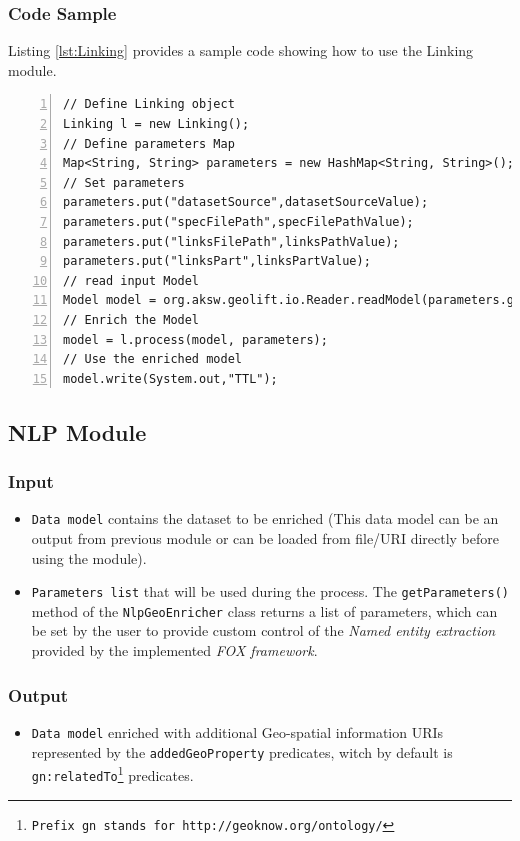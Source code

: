 \documentclass[a4paper,twoside,bibtotoc,abstracton,12pt,BCOR=15mm]{article}
\begin{document}
\subsubsection{Code Sample}
Listing \ref{lst:Linking} provides a sample code showing how to use the Linking module.
\begingroup
    \fontsize{8pt}{10pt}\selectfont
\begin{lstlisting}[label=lst:Linking, numbers=left, numberstyle=\tiny, caption = Code fragment to call the \texttt{Linking} class.]
// Define Linking object
Linking l = new Linking();
// Define parameters Map
Map<String, String> parameters = new HashMap<String, String>();
// Set parameters
parameters.put("datasetSource",datasetSourceValue);
parameters.put("specFilePath",specFilePathValue);
parameters.put("linksFilePath",linksPathValue);
parameters.put("linksPart",linksPartValue);
// read input Model
Model model = org.aksw.geolift.io.Reader.readModel(parameters.get("datasetSource"));
// Enrich the Model
model = l.process(model, parameters);
// Use the enriched model
model.write(System.out,"TTL");
\end{lstlisting}
\endgroup


\subsection{NLP Module}
\subsubsection{Input}
\begin{itemize}
 \item \texttt{Data model} contains the dataset to be enriched 
 (This data model can be an output from previous module or can be loaded from file/URI directly before using the module). 
 \item \texttt{Parameters list} that will be used during the process. The \texttt{getParameters()} method of the \texttt{NlpGeoEnricher} class returns a list of parameters,
 which can be set by the user to provide custom control of the \emph{Named entity extraction} provided by the implemented \emph{FOX framework}.
\end{itemize}

\subsubsection{Output}
\begin{itemize}
 \item \texttt{Data model} enriched with additional Geo-spatial information URIs represented by the \texttt{addedGeoProperty} predicates, 
 witch by default is \texttt{gn:relatedTo\footnote{Prefix \texttt{gn} stands for \texttt{http://geoknow.org/ontology/}}} predicates.
\end{itemize}
\end{document}
